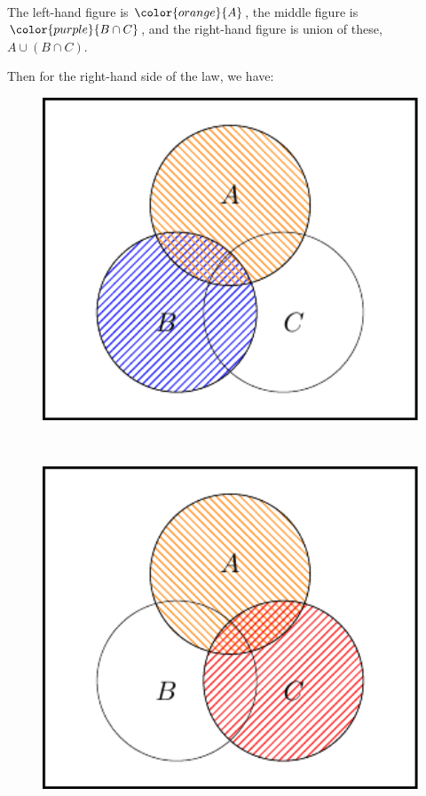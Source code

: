 \documentclass[
  letterpaper,
  DIV=11,
  numbers=noendperiod]{scrreprt}
\theoremstyle{remark}
\begin{document}
~

The left-hand figure is \(\color{orange}{A}\), the middle figure is
\(\color{purple}{B\cap C}\), and the right-hand figure is union of
these, \(A\cup (B\cap C)\).

Then for the right-hand side of the law, we have:

\begin{figure}

{\centering \includegraphics[width=1\textwidth,height=\textheight]{sections/L03-events_files/figure-pdf/dist4-1.pdf}

}

\end{figure}

~

\begin{figure}

{\centering \includegraphics[width=1\textwidth,height=\textheight]{sections/L03-events_files/figure-pdf/dist5-1.pdf}

}

\end{figure}
\end{document}
